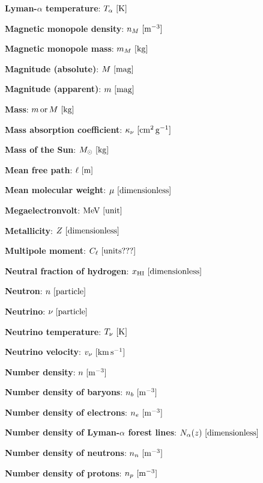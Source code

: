 \documentclass[a4paper,11pt]{article}
\begin{document}
{\noindent}\textbf{Lyman-$\alpha$ temperature}: $T_\alpha ~ [{\rm K}]$

{\noindent}\textbf{Magnetic monopole density}: $n_M ~ [{\rm m^{-3}}]$

{\noindent}\textbf{Magnetic monopole mass}: $m_M ~ [{\rm kg}]$

{\noindent}\textbf{Magnitude (absolute)}: $M ~ [{\rm mag}]$

{\noindent}\textbf{Magnitude (apparent)}: $m ~ [{\rm mag}]$

{\noindent}\textbf{Mass}: $m\,{\rm or}\,M ~ [{\rm kg}]$

{\noindent}\textbf{Mass absorption coefficient}: $\kappa_\nu ~ [{\rm cm^2\,g^{-1}}]$

{\noindent}\textbf{Mass of the Sun}: $M_\odot ~ [{\rm kg}]$

{\noindent}\textbf{Mean free path}: $\ell ~ [{\rm m}]$

{\noindent}\textbf{Mean molecular weight}: $\mu ~ [{\rm dimensionless}]$

{\noindent}\textbf{Megaelectronvolt}: ${\rm MeV} ~ [{\rm unit}]$

{\noindent}\textbf{Metallicity}: $Z ~ [{\rm dimensionless}]$

{\noindent}\textbf{Multipole moment}: $C_\ell ~ [{\rm units???}]$

{\noindent}\textbf{Neutral fraction of hydrogen}: $x_\mathrm{HI} ~ [{\rm dimensionless}]$

{\noindent}\textbf{Neutron}: $n ~ [{\rm particle}]$

{\noindent}\textbf{Neutrino}: $\nu ~ [{\rm particle}]$

{\noindent}\textbf{Neutrino temperature}: $T_\nu ~ [{\rm K}]$

{\noindent}\textbf{Neutrino velocity}: $v_\nu ~ [{\rm km\,s^{-1}}]$

{\noindent}\textbf{Number density}: $n ~ [{\rm m^{-3}}]$

{\noindent}\textbf{Number density of baryons}: $n_b ~ [{\rm m^{-3}}]$

{\noindent}\textbf{Number density of electrons}: $n_e ~ [{\rm m^{-3}}]$

{\noindent}\textbf{Number density of Lyman-$\alpha$ forest lines}: $N_\alpha(z) ~ [{\rm dimensionless}]$

{\noindent}\textbf{Number density of neutrons}: $n_n ~ [{\rm m^{-3}}]$

{\noindent}\textbf{Number density of protons}: $n_p ~ [{\rm m^{-3}}]$
\end{document}
